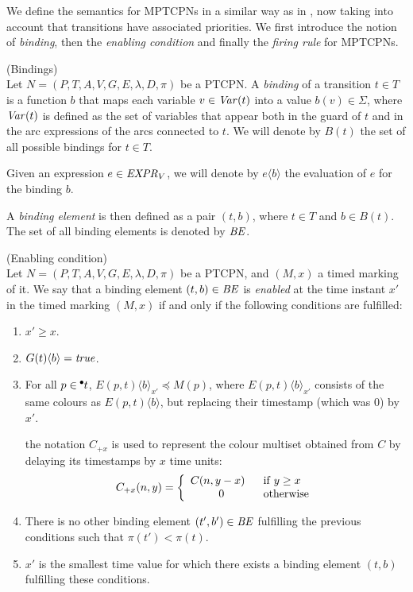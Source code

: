 We define the semantics for MPTCPNs in a similar way as in \cite{CPN09}, 
now taking into account that transitions have associated priorities.
We first introduce the notion of {\em binding}, then
the {\em enabling condition} and finally the {\em firing rule}
for MPTCPNs.

\begin{definition} (Bindings)\\
Let $N=(P,T,A,V,G,E,\lambda,D,\pi)$ be a PTCPN.
A {\em binding} of a transition $t \in T$ is a function
$b$ that maps each variable $v \in {\it Var}(t)$
into a value $b(v) \in \Sigma$, where ${\it Var}(t)$
is defined as the set of variables that appear both
in the guard of $t$ and
in the arc expressions of the arcs connected to $t$.
We will denote by $B(t)$ the set of all possible bindings
for $t \in T$. 

Given an expression $e \in {\it EXPR}_V$, we will denote 
by $e\langle b \rangle$ the evaluation of $e$ for the
binding $b$.

A {\em binding element} is then defined as a pair
$(t,b)$, where $t \in T$ and $b \in B(t)$.
The set of all binding elements is denoted by ${\it BE}$.
\end{definition}

\begin{definition}\label{permitidas} (Enabling condition)\\
Let $N=(P,T,A,V,G,E,\lambda,D,\pi)$ be a PTCPN,
and $(M,x)$ a timed marking of it.
We say that a 
binding element $(t,b) \in {\it BE}$
is {\em enabled} at the time instant $x'$ in the timed marking
$(M,x)$ if and
only if the following conditions are fulfilled:

\begin{enumerate}
\item $x' \geq x$.
%
\item $G(t)\langle b \rangle = {\it true}$.
%
\item For all $p \in \hspace*{-0.4em}~^{\bullet} \hspace*{-0.05em}t$,
$E(p,t)\langle b\rangle_{x'} \preceq M(p)$, 
where 
%
$E(p,t)\langle b \rangle_{x'}$ consists of the same
colours as $E(p,t)\langle b \rangle$, but 
replacing their timestamp (which was $0$) by $x'$.
%

the notation $C_{+x}$ is used to represent the
colour multiset obtained from $C$ by delaying its timestamps
by $x$ time units:
%
\[
C_{+x}(n,y) = \left\{
\begin{array}{cl}
C(n,y-x)~~ & {\rm if}\;y \geq  x\\
0        & {\rm otherwise}
\end{array}
\right.
\]
%
\item There is no other binding element $(t',b') \in {\it BE}$
fulfilling the previous conditions  such that $\pi(t') < \pi(t)$.
%
%
\item $x'$ is the smallest time value for which there exists
a binding element $(t,b)$ fulfilling these conditions.
%
\end{enumerate}
%
\end{definition}


